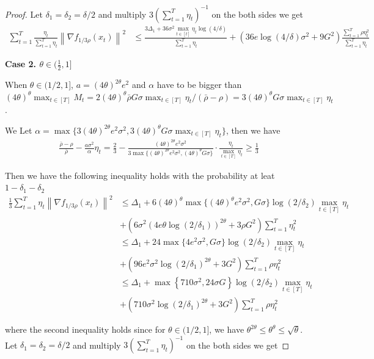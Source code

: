 \documentclass{article}
\def \brho {\bar{\rho}}
\def \sumT {\sum_{t=1}^T}
\def \nab {\nabla}
\newcommand{\norm}[2][]{\left\|#2\right\|^{#1}}
\newcommand{\Brace}[1]{\left(#1\right)}
\begin{document}
\begin{proof}
Let $\delta_1=\delta_2=\delta/2$ and multiply $3\Brace{\sumT\eta_t}^{-1}$ on the both sides we get
\begin{align}
    \sumT\frac{\eta_t}{\sumT\eta_t}\norm[2]{\nab f_{1/3\rho}(x_t)} &\leq \frac{3\Delta_1+36\sigma^2\max_{t\in[t]}\eta_t\log(4/\delta)}{\sumT\eta_t}+ \Brace{36e\log(4/\delta)\sigma^2+9G^2}\frac{\sumT\rho\eta_t^2}{\sumT\eta_t} 
\end{align}

\textbf{Case 2. $\theta\in(\frac{1}{2},1]$}

When $\theta \in(1/2,1]$, $a=(4\theta)^{2\theta}e^2$ and $\alpha$ have to be bigger than $(4\theta)^\theta\max_{t\in[T  ]}M_t=2(4\theta)^\theta\brho G\sigma\max_{t\in[T]}\eta_t/(\brho-\rho)=3(4\theta)^\theta G\sigma\max_{t\in[T]}\eta_t$. 

We Let $\alpha = \max\{3(4\theta)^{2\theta}e^2\sigma^2,3(4\theta)^{\theta}G\sigma\max_{t\in[T]}\eta_t\}$, then we have
\begin{align}
    \frac{\brho-\rho}{\brho}-\frac{a\sigma^2}{\alpha}\eta_t = \frac{2}{3} - \frac{(4\theta)^{2\theta}e^2\sigma^2}{3\max\{(4\theta)^{2\theta}e^2\sigma^2,(4\theta)^{\theta}G\sigma\}}\cdot\frac{\eta_t}{\max_{t\in[T]}\eta_t}\geq \frac{1}{3}
\end{align}

Then we have the following inequality holds with the probability at leat $1-\delta_1-\delta_2$
\begin{align}
    \frac{1}{3}\sumT \eta_t\norm[2]{\nab f_{1/3\rho}(x_t)}&\leq \Delta_1 + 6(4\theta)^{\theta}\max\{(4\theta)^{\theta}e^2\sigma^2,G\sigma\}\log(2/\delta_2)\max_{t\in[T]}\eta_t\nonumber\\
    &+ \Brace{6\sigma^2(4e\theta\log(2/\delta_1))^{2\theta}+3\rho G^2}\sumT\eta_t^2\nonumber\\
    &\leq\Delta_1 + 24\max\{4e^2\sigma^2,G\sigma\}\log(2/\delta_2)\max_{t\in[T]}\eta_t\nonumber\\
    &+ \Brace{96e^2\sigma^2\log(2/\delta_1)^{2\theta}+3G^2}\sumT \rho\eta_t^2\nonumber\\
    &\leq \Delta_1 + \max\left\{710\sigma^2,24\sigma G\right\}\log(2/\delta_2)\max_{t\in[T]}\eta_t\nonumber\\
    &+ \Brace{710\sigma^2\log(2/\delta_1)^{2\theta}+3G^2}\sumT \rho\eta_t^2
\end{align}

where the second inequality holds since for $\theta \in (1/2, 1]$, we have $\theta^{2\theta} \leq \theta^\theta \leq \sqrt{\theta}$.
Let $\delta_1=\delta_2=\delta/2$ and multiply $3\Brace{\sumT\eta_t}^{-1}$ on the both sides we get


\end{proof}
\end{document}
